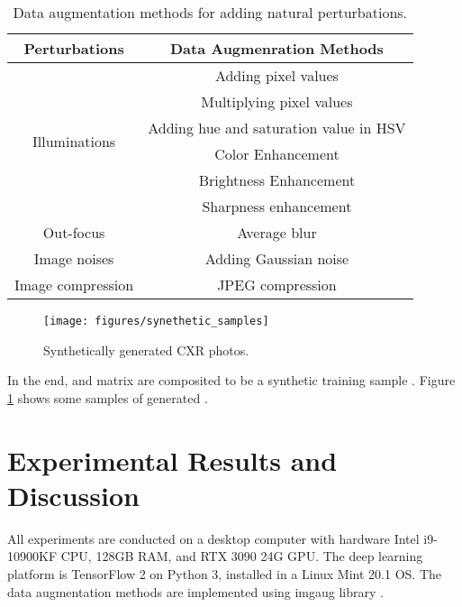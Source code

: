 \documentclass[preprint, 12pt]{elsarticle}
\begin{document}
\begin{table}
    \centering
    \footnotesize
    \begin{tabular}{|c|c|}
        \hline
        \textbf{Perturbations} & \textbf{Data Augmenration Methods} \\
        \hline
        \multirow{6}{6em}{Illuminations} & Adding pixel values \\
        \cline{2-2}
        & Multiplying pixel values \\
        \cline{2-2}
        & Adding hue and saturation value in HSV\\
        \cline{2-2}
        & Color Enhancement\\
        \cline{2-2}
        & Brightness Enhancement\\
        \cline{2-2}
        & Sharpness enhancement\\
        \hline
        Out-focus & Average blur \\
        \hline
        Image noises& Adding Gaussian noise \\
        \hline
        Image compression& JPEG compression\\
        \hline    
    \end{tabular}
    \caption{Data augmentation methods for adding natural perturbations.}
    \label{tab:dataaug}
\end{table}

\begin{figure}
    \centering
    \texttt{[image: figures/synethetic\_samples]}
    \caption{Synthetically generated CXR photos.}
    \label{fig:synthetic_samples}
\end{figure}

In the end,  and matrix  are composited to be a synthetic training sample . Figure \ref{fig:synthetic_samples} shows some samples of generated .

\section{Experimental Results and Discussion} \label{sec:Experimental Results and Discussion}

All experiments are conducted on a desktop computer with hardware Intel i9-10900KF CPU, 128GB RAM, and RTX 3090 24G GPU. The deep learning platform is TensorFlow 2 \cite{tensorflow2015-whitepaper} on Python 3, installed in a Linux Mint 20.1 OS. The data augmentation methods are implemented using imgaug library \cite{imgaug}.
\end{document}
